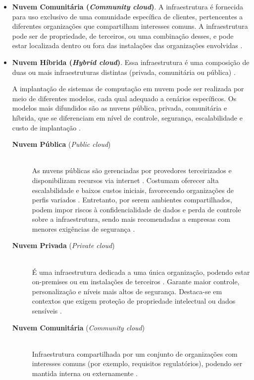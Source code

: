 \begin{itemize}
\item \textbf{Nuvem Comunitária (\textit{Community cloud})}. A infraestrutura é fornecida para uso exclusivo de uma comunidade específica de clientes, pertencentes a diferentes organizações que compartilham interesses comuns. A infraestrutura pode ser de propriedade, de terceiros, ou uma combinação desses, e pode estar localizada dentro ou fora das instalações das organizações envolvidas \cite{mell2011}.

\item \textbf{Nuvem Híbrida (\textit{Hybrid cloud})}. Essa infraestrutura é uma composição de duas ou mais infraestruturas distintas (privada, comunitária ou pública)  \cite{mell2011}.

A implantação de sistemas de computação em nuvem pode ser realizada por meio de diferentes modelos, cada qual adequado a cenários específicos. Os modelos mais difundidos são as nuvens pública, privada, comunitária e híbrida, que se diferenciam em nível de controle, segurança, escalabilidade e custo de implantação \cite{mell2011}.

\begin{description}
  \item[\textbf{Nuvem Pública} (\textit{Public cloud})] \hfill \\ As nuvens públicas são gerenciadas por provedores terceirizados e disponibilizam recursos via internet \cite{carroll2011}. Costumam oferecer alta escalabilidade e baixos custos iniciais, favorecendo organizações de perfis variados \cite{amajuoyi2024}. Entretanto, por serem ambientes compartilhados, podem impor riscos à confidencialidade de dados e perda de controle sobre a infraestrutura, sendo mais recomendadas a empresas com menores exigências de segurança \cite{sathya2023}.

  \item[\textbf{Nuvem Privada} (\textit{Private cloud})] \hfill \\ É uma infraestrutura dedicada a uma única organização, podendo estar on-premises ou em instalações de terceiros \cite{mell2011}. Garante maior controle, personalização e níveis mais altos de segurança. Destaca-se em contextos que exigem proteção de propriedade intelectual ou dados sensíveis \cite{swapna2023}.

  \item[\textbf{Nuvem Comunitária} (\textit{Community cloud})] \hfill \\ Infraestrutura compartilhada por um conjunto de organizações com interesses comuns (por exemplo, requisitos regulatórios), podendo ser mantida interna ou externamente \cite{mell2011}.


\end{description}
\end{itemize}
